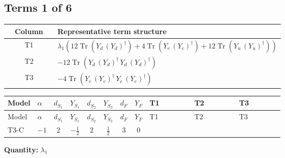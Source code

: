 \documentclass[8pt]{article}
\begin{document}
\begin{landscape}
\subsection*{Terms 1 of 6}
\begin{center}
\begin{tabular}{@{}c >{\raggedright\arraybackslash}p{0.82\linewidth}@{}}
\toprule
Column & Representative term structure \\
\midrule
T1 & \(\displaystyle {\lambda_1} (12 \operatorname{Tr}\!\left({Y_d}\,\left({Y_d}\right)^{\dagger}\right)+4 \operatorname{Tr}\!\left({Y_e}\,\left({Y_e}\right)^{\dagger}\right)+12 \operatorname{Tr}\!\left({Y_u}\,\left({Y_u}\right)^{\dagger}\right))\) \\
\midrule
T2 & \(\displaystyle -12 \operatorname{Tr}\!\left({Y_d}\,\left({Y_d}\right)^{\dagger}\,{Y_d}\,\left({Y_d}\right)^{\dagger}\right)\) \\
\midrule
T3 & \(\displaystyle -4 \operatorname{Tr}\!\left({Y_e}\,\left({Y_e}\right)^{\dagger}\,{Y_e}\,\left({Y_e}\right)^{\dagger}\right)\) \\
\midrule
\bottomrule
\end{tabular}
\end{center}
\smallskip
\tiny
\begin{longtable}{@{}llcccccc >{\raggedright\arraybackslash}p{0.21\linewidth} >{\raggedright\arraybackslash}p{0.21\linewidth} >{\raggedright\arraybackslash}p{0.21\linewidth}@{}}
\toprule
Model & $\alpha$ & $d_{S_1}$ & $Y_{S_1}$ & $d_{S_2}$ & $Y_{S_2}$ & $d_F$ & $Y_F$ & T1 & T2 & T3 \\
\midrule
\endfirsthead
\toprule
Model & $\alpha$ & $d_{S_1}$ & $Y_{S_1}$ & $d_{S_2}$ & $Y_{S_2}$ & $d_F$ & $Y_F$ & T1 & T2 & T3 \\
\midrule
\endhead
T3-C & $-1$ & $2$ & $-\frac{1}{2}$ & $2$ & $\frac{1}{2}$ & $3$ & $0$ & \scriptsize\adjustbox{max width=\linewidth}{$\begin{gathered} {\lambda_1} (12 \operatorname{Tr}\!\left({Y_d}\,\left({Y_d}\right)^{\dagger}\right)+4 \operatorname{Tr}\!\left({Y_e}\,\left({Y_e}\right)^{\dagger}\right)+12 \operatorname{Tr}\!\left({Y_u}\,\left({Y_u}\right)^{\dagger}\right))\end{gathered}$} & \scriptsize\adjustbox{max width=\linewidth}{$\begin{gathered} -12 \operatorname{Tr}\!\left({Y_d}\,\left({Y_d}\right)^{\dagger}\,{Y_d}\,\left({Y_d}\right)^{\dagger}\right)\end{gathered}$} & \scriptsize\adjustbox{max width=\linewidth}{$\begin{gathered} -4 \operatorname{Tr}\!\left({Y_e}\,\left({Y_e}\right)^{\dagger}\,{Y_e}\,\left({Y_e}\right)^{\dagger}\right)\end{gathered}$} \\
\midrule
\bottomrule
\end{longtable}
\clearpage
\noindent\textbf{Quantity: }$\lambda_1$\par\smallskip

\end{landscape}
\end{document}
